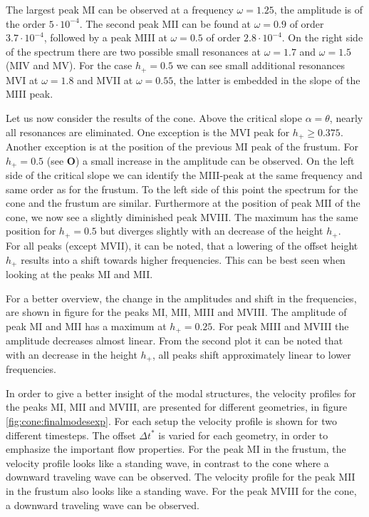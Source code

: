 The largest peak M\RN{1} can be observed at a frequency $\omega=1.25$, the amplitude is of the order $5\cdot10^{-4}$.
The second peak M\RN{2} can be found at $\omega=0.9$ of order $3.7\cdot10^{-4}$, followed by
a peak M\RN{3} at $\omega=0.5$ of order $2.8\cdot10^{-4}$.
On the right side of the spectrum there are two possible small resonances at $\omega=1.7$ and $\omega=1.5$ (M\RN{4} and M\RN{5}).
For the case $h_+=0.5$  we can see small additional resonances  M\RN{6} at $\omega=1.8$ and M\RN{7} at $\omega=0.55$,
the latter is embedded in the slope of the M\RN{3} peak.

Let us now consider the results of the cone.
Above the critical slope $\alpha=\theta$, nearly all resonances are eliminated. One exception is the M\RN{6} peak for
$h_+\geq0.375$. Another exception is at the position of the previous M\RN{1} peak of the frustum.
For $h_+=0.5$ (see \textbf{O}) a small increase in the amplitude can be observed.
On the left side of the critical slope we can identify the M\RN{3}-peak
at the same frequency and same order as for the frustum. To the left side of this point the spectrum for
the cone and the frustum are similar.
Furthermore at the position of peak M\RN{2} of the cone, we now see a slightly diminished peak M\RN{8}.
The maximum has the same position for $h_+=0.5$ but diverges slightly with an decrease of the height $h_+$.\\
For all peaks (except M\RN{7}), it can be noted, that a lowering of the offset height $h_+$ results
into a shift towards higher frequencies. This can be best seen when looking at the peaks M\RN{1} and M\RN{2}.

For a better overview, the change in the amplitudes and shift in the frequencies, are shown in
figure \label{fig:cone:finalampmax} for the peaks M\RN{1}, M\RN{2}, M\RN{3} and M\RN{8}.
The amplitude of peak M\RN{1} and M\RN{2} has a maximum at $h_+= 0.25$. For peak M\RN{3} and M\RN{8} the amplitude decreases almost linear.
From the second plot it can be noted that with an decrease in the height $h_+$,
all peaks shift approximately linear to lower frequencies.

In order to give a better insight of the modal structures, the velocity profiles for the peaks M\RN{1}, M\RN{2} and M\RN{8},
are presented for different geometries, in figure \ref{fig:cone:finalmodesexp}.
For each setup the velocity profile is shown for two different timesteps. The offset $\Delta t^*$ is varied  for each geometry, in order to emphasize
the important flow properties.
For the peak M\RN{1} in the frustum, the velocity profile looks like a standing wave,
in contrast to the cone where a downward traveling wave can be observed.
The velocity profile for the peak M\RN{2} in the frustum also looks like a standing wave.
For the peak M\RN{8} for the cone, a downward traveling wave can be observed.


